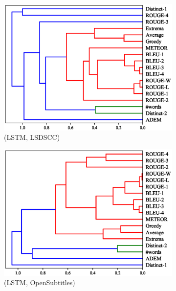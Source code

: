 \begin{figure}[htb]
\begin{subfigure}{0.40\linewidth}
        \includegraphics[width=\linewidth]{figure/plot/hierarchy/v2/pearson/lstm/lsdscc/plot.eps}
        \caption{(LSTM, LSDSCC)}
    \end{subfigure}%
    \begin{subfigure}{0.40\linewidth}
        \centering
        \includegraphics[width=\linewidth]{figure/plot/hierarchy/v2/pearson/lstm/opensub/plot.eps}
        \caption{(LSTM, OpenSubtitles)}
    \end{subfigure}%
    \begin{subfigure}{0.40\linewidth}
        \centering

\end{subfigure}
\end{figure}

